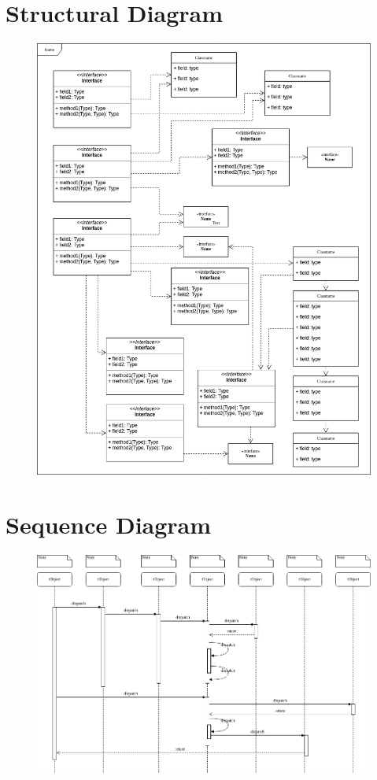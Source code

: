 \documentclass[12p]{article}
\begin{document}
\section{Structural Diagram}
\begin{figure}[H]
  \includegraphics[width=1.0\textwidth]{Structure.png}
  \caption{} %
  \label{fig:structural}
\end{figure}


\section{Sequence Diagram}
\begin{figure}[H]
  \includegraphics[width=1.0\textwidth]{Sequence.png}
  \caption{} %
  \label{fig:sequence}
\end{figure}
\end{document}
